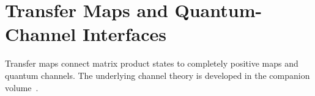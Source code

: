 \chapter{Transfer Maps and Quantum-Channel Interfaces}\label{ch:channels}

Transfer maps connect matrix product states to completely positive maps and
quantum channels. The underlying channel theory is developed in the companion
volume~\cite[``Positive map'' and ``Quantum channel'']{QICLean2026Blueprint}.



